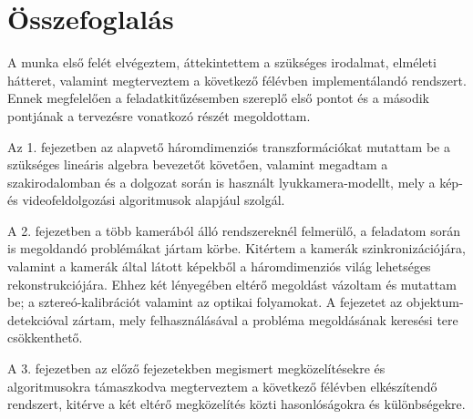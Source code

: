 {\color{red}

\chapter{Összefoglalás}

A munka első felét elvégeztem, áttekintettem a szükséges irodalmat, elméleti hátteret, valamint megterveztem a következő félévben implementálandó rendszert. Ennek megfelelően a feladatkitűzésemben szereplő első pontot és a második pontjának a tervezésre vonatkozó részét megoldottam.

Az 1. fejezetben az alapvető háromdimenziós transzformációkat mutattam be a szükséges lineáris algebra bevezetőt követően, valamint megadtam a szakirodalomban és a dolgozat során is használt lyukkamera-modellt, mely a kép- és videofeldolgozási algoritmusok alapjául szolgál.

A 2. fejezetben a több kamerából álló rendszereknél felmerülő, a feladatom során is megoldandó problémákat jártam körbe. Kitértem a kamerák szinkronizációjára, valamint a kamerák által látott képekből a háromdimenziós világ lehetséges rekonstrukciójára. Ehhez két lényegében eltérő megoldást vázoltam és mutattam be; a sztereó-kalibrációt valamint az optikai folyamokat. A fejezetet az objektum-detekcióval zártam, mely felhasználásával a probléma megoldásának keresési tere csökkenthető.

A 3. fejezetben az előző fejezetekben megismert megközelítésekre és algoritmusokra támaszkodva megterveztem a következő félévben elkészítendő rendszert, kitérve a két eltérő megközelítés közti hasonlóságokra és különbségekre.

}
